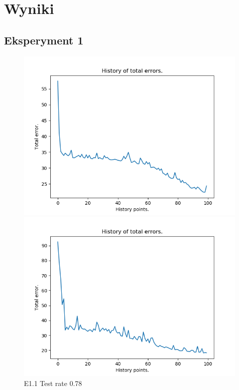 \documentclass{classrep}
\begin{document}
\section{Wyniki}

\subsection{Eksperyment 1}
		\begin{figure}[H]
			\begin{minipage}{0.5\linewidth}
				\centering
				\includegraphics[scale=0.25]{iris_nn_s2.png}
				\caption{E1.1 Test rate  0.78}
			\end{minipage}
			\begin{minipage}{0.5\linewidth}
				\centering
				\includegraphics[scale=0.25]{iris_nn_s7.png}

\end{minipage}
\end{figure}
\end{document}
